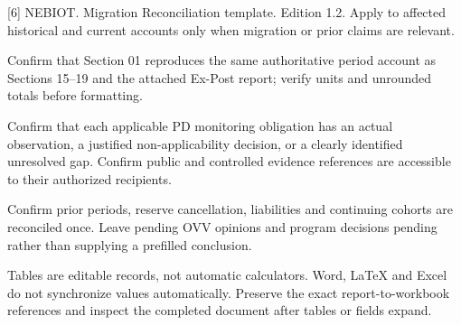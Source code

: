 [6] NEBIOT. Migration Reconciliation template. Edition 1.2. Apply to affected historical and current accounts only when migration or prior claims are relevant.\par\vspace{2mm}
Confirm that Section 01 reproduces the same authoritative period account as Sections 15–19 and the attached Ex-Post report; verify units and unrounded totals before formatting.\par
Confirm that each applicable PD monitoring obligation has an actual observation, a justified non-applicability decision, or a clearly identified unresolved gap. Confirm public and controlled evidence references are accessible to their authorized recipients.\par
Confirm prior periods, reserve cancellation, liabilities and continuing cohorts are reconciled once. Leave pending OVV opinions and program decisions pending rather than supplying a prefilled conclusion.\par
Tables are editable records, not automatic calculators. Word, LaTeX and Excel do not synchronize values automatically. Preserve the exact report-to-workbook references and inspect the completed document after tables or fields expand.\par
